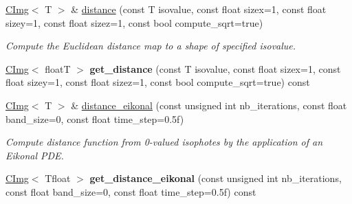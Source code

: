 \begin{DoxyCompactItemize}
\item 
\hypertarget{structcimg__library_1_1CImg_a896675c24b7a4aad089a31c98cd39318}{
\hyperlink{structcimg__library_1_1CImg}{CImg}$<$ T $>$ \& \hyperlink{structcimg__library_1_1CImg_a896675c24b7a4aad089a31c98cd39318}{distance} (const T isovalue, const float sizex=1, const float sizey=1, const float sizez=1, const bool compute\_\-sqrt=true)}
\label{structcimg__library_1_1CImg_a896675c24b7a4aad089a31c98cd39318}

\begin{DoxyCompactList}\small\item\em Compute the Euclidean distance map to a shape of specified isovalue. \item\end{DoxyCompactList}\item 
\hypertarget{structcimg__library_1_1CImg_ada7d6ed59321d50bcef3a3158d4fcbf1}{
\hyperlink{structcimg__library_1_1CImg}{CImg}$<$ floatT $>$ {\bfseries get\_\-distance} (const T isovalue, const float sizex=1, const float sizey=1, const float sizez=1, const bool compute\_\-sqrt=true) const }
\label{structcimg__library_1_1CImg_ada7d6ed59321d50bcef3a3158d4fcbf1}

\item 
\hypertarget{structcimg__library_1_1CImg_afc52551ed84f29e0c4725345cfd32f6c}{
\hyperlink{structcimg__library_1_1CImg}{CImg}$<$ T $>$ \& \hyperlink{structcimg__library_1_1CImg_afc52551ed84f29e0c4725345cfd32f6c}{distance\_\-eikonal} (const unsigned int nb\_\-iterations, const float band\_\-size=0, const float time\_\-step=0.5f)}
\label{structcimg__library_1_1CImg_afc52551ed84f29e0c4725345cfd32f6c}

\begin{DoxyCompactList}\small\item\em Compute distance function from 0-\/valued isophotes by the application of an Eikonal PDE. \item\end{DoxyCompactList}\item 
\hypertarget{structcimg__library_1_1CImg_a962a333b5caf63dfa101978d7c76beda}{
\hyperlink{structcimg__library_1_1CImg}{CImg}$<$ Tfloat $>$ {\bfseries get\_\-distance\_\-eikonal} (const unsigned int nb\_\-iterations, const float band\_\-size=0, const float time\_\-step=0.5f) const }
\label{structcimg__library_1_1CImg_a962a333b5caf63dfa101978d7c76beda}


\end{DoxyCompactItemize}

